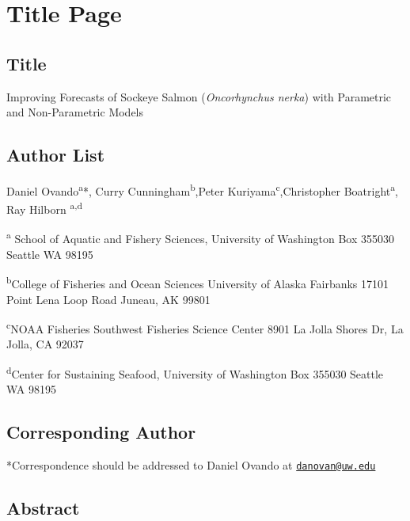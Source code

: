 \documentclass[
]{article}
\author{}
\date{\vspace{-2.5em}}
\begin{document}
\newpage

\hypertarget{title-page}{%
\section*{Title Page}\label{title-page}}

\hypertarget{title}{%
\subsection*{Title}\label{title}}

Improving Forecasts of Sockeye Salmon (\emph{Oncorhynchus nerka}) with Parametric and Non-Parametric Models

\hypertarget{author-list}{%
\subsection*{Author List}\label{author-list}}

Daniel Ovando\textsuperscript{a}*, Curry Cunningham\textsuperscript{b},Peter Kuriyama\textsuperscript{c},Christopher Boatright\textsuperscript{a}, Ray Hilborn \textsuperscript{a,d}

\textsuperscript{a} School of Aquatic and Fishery Sciences, University of Washington Box 355030 Seattle WA 98195

\textsuperscript{b}College of Fisheries and Ocean Sciences University of Alaska Fairbanks 17101 Point Lena Loop Road Juneau, AK 99801

\textsuperscript{c}NOAA Fisheries Southwest Fisheries Science Center 8901 La Jolla Shores Dr, La Jolla, CA 92037

\textsuperscript{d}Center for Sustaining Seafood, University of Washington Box 355030 Seattle WA 98195

\hypertarget{corresponding-author}{%
\subsection*{Corresponding Author}\label{corresponding-author}}

*Correspondence should be addressed to Daniel Ovando at \href{mailto:danovan@uw.edu}{\nolinkurl{danovan@uw.edu}}

\newpage

\hypertarget{abstract}{%
\subsection*{Abstract}\label{abstract}}
\end{document}
